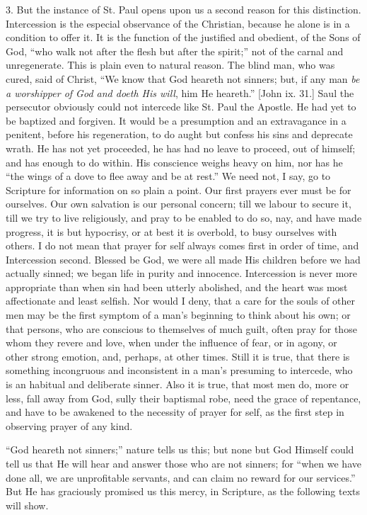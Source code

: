 3. But the instance of St. Paul opens upon us a second reason for
this distinction. Intercession is the especial observance of the
Christian, because he alone is in a condition to offer it. It is the
function of the justified and obedient, of the Sons of God, ``who
walk not after the flesh but after the spirit;'' not of the carnal
and unregenerate. This is plain even to natural reason. The blind man,
who was cured, said of Christ, ``We know that God heareth not
sinners; but, if any man \emph{be a worshipper of God and doeth His will},
him He heareth.'' [John ix. 31.] Saul the persecutor obviously
could not intercede like St. Paul the Apostle. He had yet to be
baptized and forgiven. It would be a presumption and an extravagance
in a penitent, before his regeneration, to do aught but confess his
sins and deprecate wrath. He has not yet proceeded, he has had no
leave to proceed, out of himself; and has enough to do within. His
conscience weighs heavy on him, nor has he ``the wings of a dove
to flee away and be at rest.'' We need not, I say, go to Scripture
for information on so plain a point. Our first prayers ever must be
for ourselves. Our own salvation is our personal concern; till we
labour to secure it, till we try to live religiously, and pray to be
enabled to do so, nay, and have made progress, it is but hypocrisy, or
at best it is overbold, to busy ourselves with others. I do not mean
that prayer for self always comes first in order of time, and
Intercession second. Blessed be God, we were all made His children
before we had actually sinned; we began life in purity and innocence.
Intercession is never more appropriate than when sin had been utterly
abolished, and the heart was most affectionate and least selfish. Nor
would I deny, that a care for the souls of other men may be the first
symptom of a man's beginning to think about his own; or that
persons, who are conscious to themselves of much guilt, often pray for
those whom they revere and love, when under the influence of fear, or
in agony, or other strong emotion, and, perhaps, at other times. Still
it is true, that there is something incongruous and inconsistent in a
man's presuming to intercede, who is an habitual and deliberate
sinner. Also it is true, that most men do, more or less, fall away
from God, sully their baptismal robe, need the grace of repentance,
and have to be awakened to the necessity of prayer for self, as the
first step in observing prayer of any kind.

``God heareth not sinners;'' nature tells us this; but none
but God Himself could tell us that He will hear and answer those who
are not sinners; for ``when we have done all, we are unprofitable
servants, and can claim no reward for our services.'' But He has
graciously promised us this mercy, in Scripture, as the following
texts will show.

